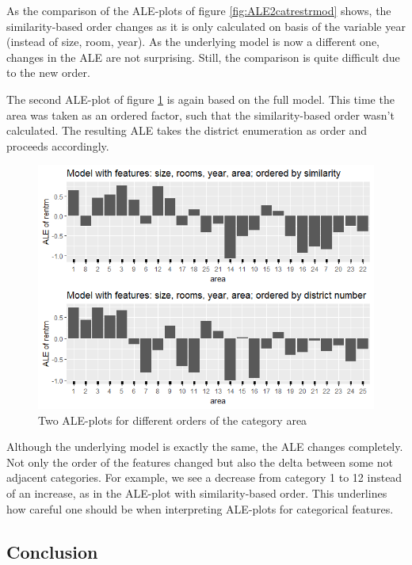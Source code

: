 \documentclass[
]{krantz}
\begin{document}
As the comparison of the ALE-plots of figure \ref{fig:ALE2catrestrmod} shows, the similarity-based order changes as it is only calculated on basis of the variable year (instead of size, room, year). As the underlying model is now a different one, changes in the ALE are not surprising. Still, the comparison is quite difficult due to the new order.

The second ALE-plot of figure \ref{fig:ALE2catdifford} is again based on the full model. This time the area was taken as an ordered factor, such that the similarity-based order wasn't calculated. The resulting ALE takes the district enumeration as order and proceeds accordingly.

\begin{figure}
\includegraphics[width=1\linewidth]{images/ALE_2_cat_different_orders_} \caption{Two ALE-plots for different orders of the category area}\label{fig:ALE2catdifford}
\end{figure}



Although the underlying model is exactly the same, the ALE changes completely. Not only the order of the features changed but also the delta between some not adjacent categories. For example, we see a decrease from category 1 to 12 instead of an increase, as in the ALE-plot with similarity-based order. This underlines how careful one should be when interpreting ALE-plots for categorical features.

\hypertarget{conclusion-1}{%
\subsection{Conclusion}\label{conclusion-1}}
\end{document}
